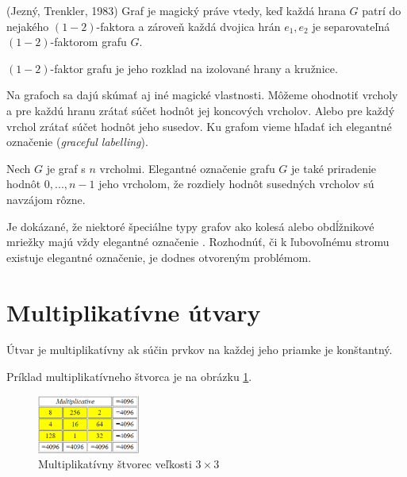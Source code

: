 \begin{subtheorem} (Jezný, Trenkler, 1983) Graf je magický práve vtedy, keď každá hrana $G$ patrí do nejakého $(1-2)$-faktora a zároveň každá dvojica hrán $e_1, e_2$ je separovateľná $(1-2)$-faktorom grafu $G$.
\end{subtheorem}

\begin{subnote} $(1-2)$-faktor grafu je jeho rozklad na izolované hrany a kružnice.
\end{subnote} 

Na grafoch sa dajú skúmať aj iné magické vlastnosti. Môžeme ohodnotiť vrcholy a pre každú hranu zrátať súčet hodnôt jej koncových vrcholov. Alebo pre každý vrchol zrátať súčet hodnôt jeho susedov. Ku grafom vieme hľadať ich elegantné označenie (\textit{graceful labelling}).

\begin{subdefinition}
Nech $G$ je graf s $n$ vrcholmi. Elegantné označenie grafu $G$ je také priradenie hodnôt $0, ... , n-1$ jeho vrcholom, že rozdiely hodnôt susedných vrcholov sú navzájom rôzne.
\end{subdefinition}

Je dokázané, že niektoré špeciálne typy grafov ako kolesá alebo obdĺžnikové mriežky majú vždy elegantné označenie \cite{labelling}. Rozhodnúť, či k ľubovoľnému stromu existuje elegantné označenie, je dodnes otvoreným problémom. \\

\section{Multiplikatívne útvary}
\begin{definition} Útvar je multiplikatívny ak súčin prvkov na každej jeho priamke je konštantný.
\end{definition}

Príklad multiplikatívneho štvorca je na obrázku \ref{obr:fig_basic_mult_3x3}.

\begin{figure}[H]
\centerline{\includegraphics[width=0.3\textwidth]{images/basic_mult_3x3}}
\caption[Multiplikatívny štvorec veľkosti $3 \times 3$]{Multiplikatívny štvorec veľkosti $3 \times 3$ \cite{multimagie}}
\label{obr:fig_basic_mult_3x3}
\end{figure}

